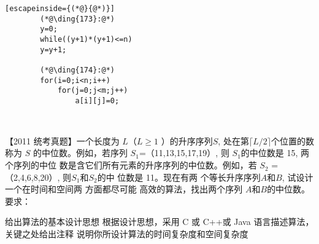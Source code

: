 \begin{questions}[tr]
\begin{bbox}
\begin{lstlisting}[escapeinside={(*@}{@*)}]
        (*@\ding{173}:@*)
        y=0;
        while((y+1)*(y+1)<=n)
        y=y+1;
    
        (*@\ding{174}:@*)
        for(i=0;i<n;i++)
            for(j=0;j<m;j++)
                a[i][j]=0;
    
        
        \end{lstlisting}
    \end{bbox}

    \begin{bbox}
        \question[2] 【2011 统考真题】一个长度为 $L$（$L\geqslant 1$ ）的升序序列$ S$, 处在第$\lceil L/2\rceil $个位置的数称为 $S$
        的中位数。例如，若序列 $S_1$=（11,13,15,17,19）, 则 $S_1$的中位数是 15, 两 个序列的中位
        数是含它们所有元素的升序序列的中位数。例如，若 $S_2$ =（2,4,6,8,20）, 则$S_1$和$S_2$的中
        位数是 11。现在有两 个等长升序序列$A$和$B$, 试设计一个在时间和空间两 方面都尽可能
        高效的算法，找出两个序列 $A$和$B$的中位数。要求：
        \begin{subquestions}
            \subquestion 给出算法的基本设计思想
            \subquestion  根据设计思想，采用 C 或 C++或 Java 语言描述算法，关键之处给出注释
            \subquestion 说明你所设计算法的时间复杂度和空间复杂度
        \end{subquestions}
    \end{bbox}
\end{questions}
    